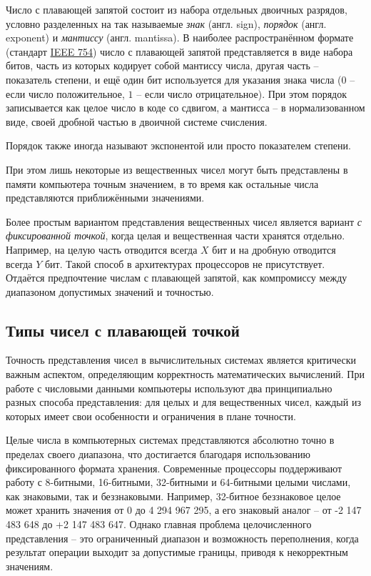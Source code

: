 Число с плавающей запятой состоит из набора отдельных двоичных разрядов, 
условно разделенных на так называемые \textit{знак} (англ. sign), \textit{порядок} (англ. exponent)
и \textit{мантиссу} (англ. mantissa). В наиболее 
распространённом формате (стандарт \href{https://en.wikipedia.org/wiki/IEEE_754}{IEEE 754})
 число с плавающей запятой представляется в виде набора 
битов, часть из которых кодирует собой мантиссу числа, другая часть -- 
показатель степени, и ещё один бит используется для указания знака числа ($0$ 
-- если число положительное, $1$ -- если число отрицательное). При этом 
порядок записывается как целое число в коде со сдвигом, а мантисса -- в 
нормализованном виде, своей дробной частью в двоичной системе счисления.

Порядок также иногда называют экспонентой или просто показателем степени.

При этом лишь некоторые из вещественных чисел могут быть представлены в 
памяти компьютера точным значением, в то время как остальные числа 
представляются приближёнными значениями.

Более простым вариантом представления вещественных чисел является вариант \textit{с фиксированной точкой}, когда целая и вещественная части хранятся отдельно. Например, на целую 
часть отводится всегда $X$ бит и на дробную отводится всегда $Y$ бит. Такой способ в архитектурах процессоров не присутствует. Отдаётся предпочтение числам с плавающей запятой, 
как компромиссу между диапазоном допустимых значений и точностью.

\subsection{Типы чисел с плавающей точкой}

Точность представления чисел в вычислительных системах является критически важным аспектом, определяющим корректность математических вычислений. При работе с числовыми 
данными компьютеры используют два принципиально разных способа представления: для целых и для вещественных чисел, каждый из которых имеет свои особенности и ограничения в 
плане точности.

Целые числа в компьютерных системах представляются абсолютно точно в пределах своего диапазона, что достигается благодаря использованию фиксированного формата хранения. 
Современные процессоры поддерживают работу с 8-битными, 16-битными, 32-битными и 64-битными целыми числами, как знаковыми, так и беззнаковыми. Например, 32-битное 
беззнаковое целое может хранить значения от 0 до 4 294 967 295, а его знаковый аналог -- от -2 147 483 648 до +2 147 483 647. Однако главная проблема целочисленного 
представления -- это ограниченный диапазон и возможность переполнения, когда результат операции выходит за допустимые границы, приводя к некорректным значениям.

